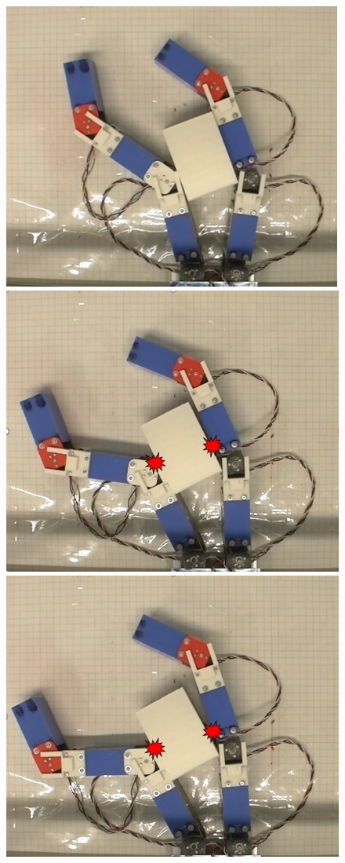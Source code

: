 \documentclass[a4paper,papersize,dvipdfmx]{mtabst}
\begin{document}
\begin{figure}[t]
	\begin{minipage}{0.33\linewidth}
	\includegraphics[width=0.85\linewidth]{fig/abstract/parallel1.jpg}
	\end{minipage}\hfill
	\begin{minipage}{0.33\linewidth}
	\includegraphics[width=0.85\linewidth]{fig/abstract/parallel2.jpg}
	\end{minipage}\hfill
	\begin{minipage}{0.33\linewidth}
	\includegraphics[width=0.85\linewidth]{fig/abstract/parallel3.jpg}

\end{minipage}
\end{figure}
\end{document}
